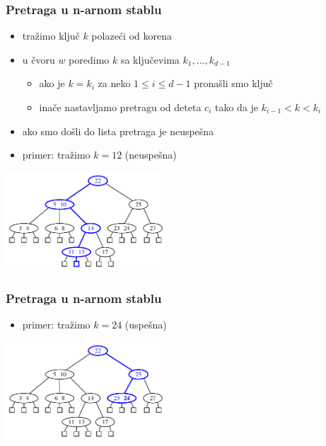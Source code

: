\documentclass[compress]{beamer}
\begin{document}
\begin{frame}[fragile]
  \frametitle{Pretraga u n-arnom stablu}
  \begin{itemize}
    \item tražimo ključ $k$ polazeći od korena
    \item u čvoru $w$ poredimo $k$ sa ključevima $k_1, \ldots, k_{d-1}$
    \begin{itemize}
      \item ako je $k=k_i$ za neko $1\leq i\leq d-1$ pronašli smo ključ
      \item inače nastavljamo pretragu od deteta $c_i$ tako da je $k_{i-1}<k<k_i$ 
    \end{itemize}
    \item ako smo došli do lista pretraga je neuspešna
    \item primer: tražimo $k=12$ (neuspešna)
  \end{itemize}
  \begin{center}
    \includegraphics[width=6cm]{asp-11-pic28.pdf}
  \end{center}
\end{frame}

\begin{frame}[fragile]
  \frametitle{Pretraga u n-arnom stablu}
  \begin{itemize}
    \item primer: tražimo $k=24$ (uspešna)
  \end{itemize}
  \begin{center}
    \includegraphics[width=6cm]{asp-11-pic29.pdf}
  \end{center}
\end{frame}
\end{document}
